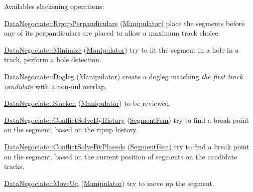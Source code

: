Availables slackening operations\+:
\begin{DoxyEnumerate}
\item \mbox{\hyperlink{classKite_1_1DataNegociate_ab7ccb6fc1f298728995250a3bbcf18c7a19d8d157762b2b73c5274e4865523d29}{Data\+Negociate\+::\+Ripup\+Perpandiculars}} (\mbox{\hyperlink{classKite_1_1Manipulator}{Manipulator}}) place the segments before any of it\textquotesingle{}s perpandiculars are placed to allow a maximum track choice.
\item \mbox{\hyperlink{classKite_1_1DataNegociate_ab7ccb6fc1f298728995250a3bbcf18c7a548e204a4e2ffae50774910737f11380}{Data\+Negociate\+::\+Minimize}} (\mbox{\hyperlink{classKite_1_1Manipulator}{Manipulator}}) try to fit the segment in a hole in a track, perform a hole detection.
\item \mbox{\hyperlink{classKite_1_1DataNegociate_ab7ccb6fc1f298728995250a3bbcf18c7a361bca46d5e7bdf02f50f7ecaa6018a9}{Data\+Negociate\+::\+Dogleg}} (\mbox{\hyperlink{classKite_1_1Manipulator}{Manipulator}}) create a dogleg matching {\itshape the first track candidate} with a non-\/nul overlap.
\item \mbox{\hyperlink{classKite_1_1DataNegociate_ab7ccb6fc1f298728995250a3bbcf18c7a0d4bff02b3163821c0e5f7ad9dd55f36}{Data\+Negociate\+::\+Slacken}} (\mbox{\hyperlink{classKite_1_1Manipulator}{Manipulator}}) to be reviewed.
\item \mbox{\hyperlink{classKite_1_1DataNegociate_ab7ccb6fc1f298728995250a3bbcf18c7ae08187cba35efd6229ab8acfd003a600}{Data\+Negociate\+::\+Conflict\+Solve\+By\+History}} (\mbox{\hyperlink{classKite_1_1SegmentFsm}{Segment\+Fsm}}) try to find a break point on the segment, based on the ripup history.
\item \mbox{\hyperlink{classKite_1_1DataNegociate_ab7ccb6fc1f298728995250a3bbcf18c7afce071be0ba39626ed1c865789da598b}{Data\+Negociate\+::\+Conflict\+Solve\+By\+Placeds}} (\mbox{\hyperlink{classKite_1_1SegmentFsm}{Segment\+Fsm}}) try to find a break point on the segment, based on the current position of segments on the candidate tracks.
\item \mbox{\hyperlink{classKite_1_1DataNegociate_ab7ccb6fc1f298728995250a3bbcf18c7adfd76a7d65b56ed7ecc0eedf921d6f82}{Data\+Negociate\+::\+Move\+Up}} (\mbox{\hyperlink{classKite_1_1Manipulator}{Manipulator}}) try to move up the segment.
\end{DoxyEnumerate}

